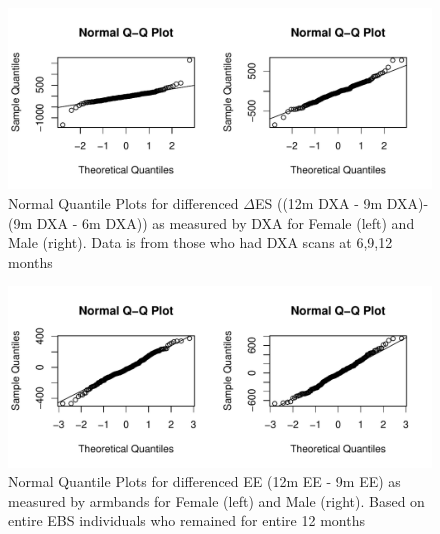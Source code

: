 \documentclass[11pt]{article}\usepackage[]{graphicx}\usepackage[]{color}
\makeatletter
\def\maxwidth{ %
  \ifdim\Gin@nat@width>\linewidth
    \linewidth
  \else
    \Gin@nat@width
  \fi
}
\newenvironment{knitrout}{}{} %
\makeatother
\begin{document}
\begin{knitrout}
\color{fgcolor}\begin{figure}

{\centering \includegraphics[width=\maxwidth]{figure/ebsdiag3-1} 

}

\caption[Normal Quantile Plots for differenced ]{Normal Quantile Plots for differenced $\Delta$ES ((12m DXA - 9m DXA)-(9m DXA - 6m DXA)) as measured by DXA for Female (left) and Male (right). Data is from those who had DXA scans at 6,9,12 months}\label{fig:ebsdiag3}
\end{figure}


\end{knitrout}


\begin{knitrout}
\color{fgcolor}\begin{figure}

{\centering \includegraphics[width=\maxwidth]{figure/ebsdiag4-1} 

}

\caption[Normal Quantile Plots for differenced EE (12m EE - 9m EE) as measured by armbands for Female (left) and Male (right)]{Normal Quantile Plots for differenced EE (12m EE - 9m EE) as measured by armbands for Female (left) and Male (right). Based on entire EBS individuals who remained for entire 12 months}\label{fig:ebsdiag4}
\end{figure}


\end{knitrout}
\end{document}
